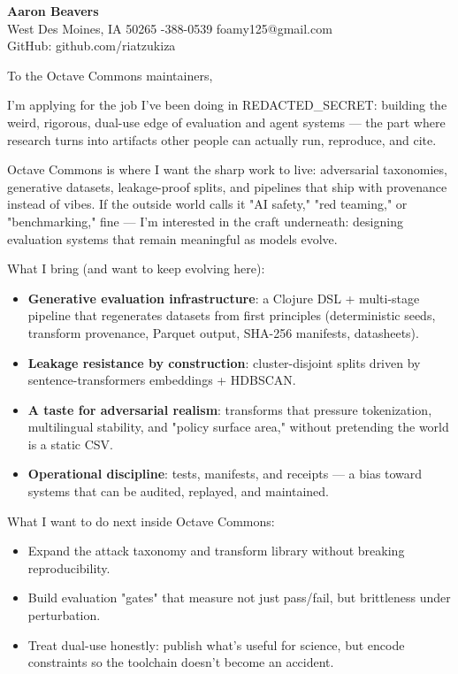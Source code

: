 \documentclass[10pt]{article}
\begin{document}
{\LARGE \textbf{Aaron Beavers}}\\
West Des Moines, IA 50265 \;\;\textbar\;-388-0539 \;\;\textbar\;\; foamy125@gmail.com\\
GitHub: github.com/riatzukiza

\vspace{10pt}
To the Octave Commons maintainers,

I'm applying for the job I've been doing in REDACTED_SECRET: building the weird, rigorous, dual-use edge of evaluation and agent systems --- the part where research turns into artifacts other people can actually run, reproduce, and cite.

Octave Commons is where I want the sharp work to live: adversarial taxonomies, generative datasets, leakage-proof splits, and pipelines that ship with provenance instead of vibes. If the outside world calls it "AI safety," "red teaming," or "benchmarking," fine --- I'm interested in the craft underneath: designing evaluation systems that remain meaningful as models evolve.

What I bring (and want to keep evolving here):
\begin{itemize}
  \item \textbf{Generative evaluation infrastructure}: a Clojure DSL + multi-stage pipeline that regenerates datasets from first principles (deterministic seeds, transform provenance, Parquet output, SHA-256 manifests, datasheets).
  \item \textbf{Leakage resistance by construction}: cluster-disjoint splits driven by sentence-transformers embeddings + HDBSCAN.
  \item \textbf{A taste for adversarial realism}: transforms that pressure tokenization, multilingual stability, and "policy surface area," without pretending the world is a static CSV.
  \item \textbf{Operational discipline}: tests, manifests, and receipts --- a bias toward systems that can be audited, replayed, and maintained.
\end{itemize}

What I want to do next inside Octave Commons:
\begin{itemize}
  \item Expand the attack taxonomy and transform library without breaking reproducibility.
  \item Build evaluation "gates" that measure not just pass/fail, but brittleness under perturbation.
  \item Treat dual-use honestly: publish what's useful for science, but encode constraints so the toolchain doesn't become an accident.
\end{itemize}
\end{document}
